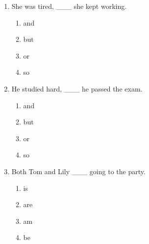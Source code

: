 \documentclass[11pt,a4paper]{ctexart}
\begin{document}
\begin{enumerate}[leftmargin=*,itemsep=4pt]
\begin{enumerate}[label=\Alph*.,leftmargin=2em,itemsep=1pt,topsep=2pt]
\item but
\item so
\end{enumerate}
\item She was tired, \_\_\_ she kept working.
\begin{enumerate}[label=\Alph*.,leftmargin=2em,itemsep=1pt,topsep=2pt]
\item and
\item but
\item or
\item so
\end{enumerate}
\item He studied hard, \_\_\_ he passed the exam.
\begin{enumerate}[label=\Alph*.,leftmargin=2em,itemsep=1pt,topsep=2pt]
\item and
\item but
\item or
\item so
\end{enumerate}
\item Both Tom and Lily \_\_\_ going to the party.
\begin{enumerate}[label=\Alph*.,leftmargin=2em,itemsep=1pt,topsep=2pt]
\item is
\item are
\item am
\item be
\end{enumerate}
\end{enumerate}
\end{document}
